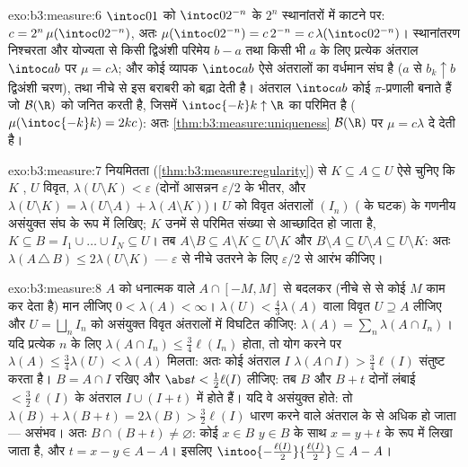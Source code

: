 \begin{solution}{exo:b3:measure:6}
$\intoc01$ को $\intoc0{2^{-n}}$ के $2^n$ स्थानांतरों में काटने पर: $c = 2^n\,\mu(\intoc0{2^{-n}})$, अतः $\mu(\intoc0{2^{-n}}) =
c\,2^{-n} = c\,\lambda(\intoc0{2^{-n}})$।
स्थानांतरण निश्चरता और योज्यता से किसी द्विअंशी परिमेय $b - a$ तथा किसी
भी $a$ के लिए प्रत्येक अंतराल $\intoc ab$ पर $\mu = c\lambda$; और कोई व्यापक $\intoc ab$ ऐसे
अंतरालों का वर्धमान संघ है ($a$ से $b_k \uparrow b$ द्विअंशी चरण), तथा नीचे से
 इस बराबरी को बढ़ा देती है। अंतराल $\intoc ab$ कोई $\pi$-प्रणाली बनाते
हैं जो $\mathcal B(\R)$ को जनित करती है, जिसमें $\intoc{-k}k
\uparrow \R$ का  परिमित है ($\mu(\intoc{-k}k) = 2kc$):
अतः \cref{thm:b3:measure:uniqueness} $\mathcal B(\R)$ पर $\mu = c\lambda$ दे देती है।
\end{solution}

\begin{solution}{exo:b3:measure:7}
नियमितता (\cref{thm:b3:measure:regularity}) से $K
\subseteq A \subseteq U$ ऐसे चुनिए कि $K$ , $U$ विवृत, $\lambda(U\setminus K) < \varepsilon$
(दोनों आसन्नन $\varepsilon/2$ के भीतर, और $\lambda(U \setminus K) =
\lambda(U\setminus A) + \lambda(A \setminus K)$)। $U$ को विवृत अंतरालों
$(I_n)$ ( के घटक) के गणनीय असंयुक्त संघ के रूप में लिखिए;
 $K$ उनमें से परिमित संख्या से आच्छादित हो जाता है, $K \subseteq B = I_1\cup\dots\cup I_N \subseteq
U$। तब
$A \setminus B \subseteq A\setminus K \subseteq
U\setminus K$ और $B \setminus A \subseteq U \setminus A
\subseteq U\setminus K$: अतः $\lambda(A\,\triangle\,B) \leq 2\lambda(U\setminus K)$ --- $\varepsilon$ से नीचे उतरने के लिए $\varepsilon/2$ से
आरंभ कीजिए।
\end{solution}

\begin{solution}{exo:b3:measure:8}
$A$ को धनात्मक  वाले $A \cap [-M, M]$ से बदलकर (नीचे से  से कोई
$M$ काम कर देता है) मान लीजिए $0 < \lambda(A) <
\infty$। $\lambda(U) <
\frac43\lambda(A)$ वाला विवृत $U \supseteq A$ लीजिए
और $U = \bigsqcup_nI_n$ को असंयुक्त विवृत अंतरालों में विघटित कीजिए: $\lambda(A) = \sum_n\lambda(A\cap
I_n)$। यदि
प्रत्येक $n$ के लिए $\lambda(A\cap I_n) \leq
\frac34\ell(I_n)$ होता, तो योग करने पर $\lambda(A) \leq
\frac34\lambda(U) < \lambda(A)$ मिलता: अतः
कोई अंतराल $I$ $\lambda(A\cap I) > \frac34\ell(I)$ संतुष्ट करता है। $B = A \cap I$ रखिए और $\abs t < \frac12\ell(I)$ लीजिए:
तब $B$ और $B + t$ दोनों लंबाई $< \frac32\ell(I)$ के अंतराल $I \cup (I + t)$ में होते हैं।
यदि वे असंयुक्त होते: तो $\lambda(B) + \lambda(B + t) = 2\lambda(B)
> \frac32\ell(I)$ धारण करने वाले अंतराल के  से अधिक
हो जाता --- असंभव। अतः $B \cap (B + t) \neq \varnothing$: कोई $x \in B$ $y \in B$ के साथ $x = y + t$ के रूप
में लिखा जाता है, और $t = x -
y \in A - A$। इसलिए $\intoo{-\frac{\ell(I)}2}{\frac{\ell(I)}2} \subseteq A -
A$।
\end{solution}

